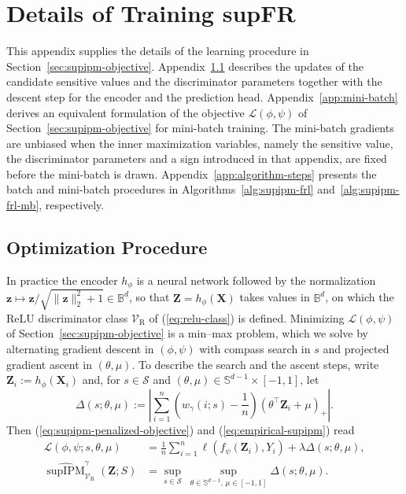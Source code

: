 \documentclass{article} %
\begin{document}
\raggedbottom
\section{Details of Training supFR}
\label{app:algorithm}

This appendix supplies the details of the learning procedure in Section~\ref{sec:supipm-objective}.  Appendix~\ref{app:ascent} describes the updates of the candidate sensitive values and the discriminator parameters together with the descent step for the encoder and the prediction head.
Appendix~\ref{app:mini-batch} derives an equivalent formulation of the objective $\mathcal{L}(\phi,\psi)$ of Section~\ref{sec:supipm-objective} for mini-batch training.
The mini-batch gradients are unbiased when the inner maximization variables, namely the sensitive value, the discriminator parameters and a sign introduced in that appendix, are fixed before the mini-batch is drawn.
Appendix~\ref{app:algorithm-steps} presents the batch and mini-batch procedures in Algorithms~\ref{alg:supipm-frl} and~\ref{alg:supipm-frl-mb}, respectively.

\subsection{Optimization Procedure}
\label{app:ascent}

In practice the encoder $h_{\phi}$ is a neural network followed by the normalization $\mathbf{z}\mapsto\mathbf{z}/\sqrt{\lVert\mathbf{z}\rVert_2^2+1}\in\mathbb{B}^d$, so that $\mathbf{Z}=h_{\phi}(\mathbf{X})$ takes values in $\mathbb{B}^d$, on which the ReLU discriminator class $\mathcal{V}_{\mathrm{R}}$ of (\ref{eq:relu-class}) is defined.  Minimizing $\mathcal{L}(\phi,\psi)$ of Section~\ref{sec:supipm-objective} is a min--max problem, which we solve by alternating gradient descent in $(\phi,\psi)$ with compass search in $s$ \citep{kolda2003optimization} and projected gradient ascent in $(\theta,\mu)$.  To describe the search and the ascent steps, write $\mathbf{Z}_i:=h_{\phi}(\mathbf{X}_i)$ and, for $s\in\mathcal{S}$ and $(\theta,\mu)\in\mathbb{S}^{d-1}\times[-1,1]$, let
\begin{equation}
  \Delta(s;\theta,\mu)
  :=\left|
    \sum_{i=1}^n
    \left(\widehat{w}_{\gamma}(i;s)-\frac{1}{n}\right)
    (\theta^\top\mathbf{Z}_i+\mu)_+
  \right|.
  \label{eq:discriminator-discrepancy}
\end{equation}
Then (\ref{eq:supipm-penalized-objective}) and (\ref{eq:empirical-supipm}) read
\[
\begin{aligned}
  \mathcal{L}(\phi,\psi;s,\theta,\mu)
  &=\frac{1}{n}\sum_{i=1}^n\ell\!\left(f_{\psi}(\mathbf{Z}_i),Y_i\right)+\lambda\Delta(s;\theta,\mu),
  \\
  \widehat{\operatorname{supIPM}}^{\gamma}_{\mathcal{V}_{\mathrm{R}}}(\mathbf{Z};S)
  &=\sup_{s\in\mathcal{S}}\ \sup_{\theta\in\mathbb{S}^{d-1},\,\mu\in[-1,1]}\Delta(s;\theta,\mu).
\end{aligned}
\]
\end{document}
